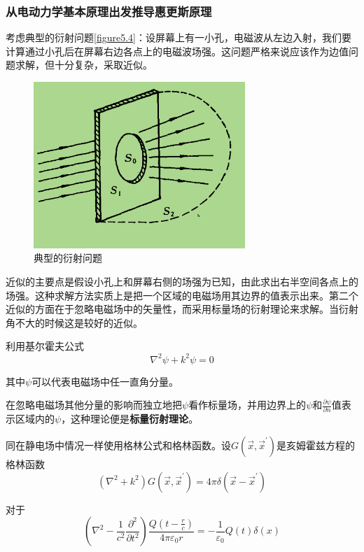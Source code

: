 \documentclass[UTF8]{ctexart}
\begin{document}
    \subsubsection{从电动力学基本原理出发推导惠更斯原理}
    考虑典型的衍射问题\autoref{figure5.4}：设屏幕上有一小孔，电磁波从左边入射，我们要计算通过小孔后在屏幕右边各点上的电磁波场强。这问题严格来说应该作为边值问题求解，但十分复杂，采取近似。
    \begin{figure}[htb]
        \centering
        \includegraphics[width=8cm]{figure5-4.png}
        \caption{典型的衍射问题}
        \label{figure5.4}
    \end{figure}

    近似的主要点是假设小孔上和屏幕右侧的场强为已知，由此求出右半空间各点上的场强。这种求解方法实质上是把一个区域的电磁场用其边界的值表示出来。第二个近似的方面在于忽略电磁场中的矢量性，而采用标量场的衍射理论来求解。当衍射角不大的时候这是较好的近似。

    利用基尔霍夫公式
    \begin{equation}
        \nabla^2 \psi + k^2 \psi = 0
    \end{equation}

\noindent 其中$\psi$可以代表电磁场中任一直角分量。

    在忽略电磁场其他分量的影响而独立地把$\psi$看作标量场，并用边界上的$\psi$和$\frac{\partial \psi }{\partial n}$值表示区域内的$\psi$，这种理论便是\textbf{标量衍射理论}。

    同在静电场中情况一样使用格林公式和格林函数。设$G(\vec{x},\vec{x}^{\prime})$是亥姆霍兹方程的格林函数
    \begin{equation}
        (\nabla^2 + k^2)G(\vec{x},\vec{x}^{\prime}) = 4 \pi \delta (\vec{x}- \vec{x}^{\prime})
    \end{equation}

\noindent 对于
\begin{equation}
    \left(\nabla^{2}-\frac{1}{c^{2}} \frac{\partial^{2}}{\partial t^{2}}\right) \frac{Q\left(t-\frac{r}{c}\right)}{4 \pi \varepsilon_{0} r}=-\frac{1}{\varepsilon_{0}} Q(t) \delta(x)
\end{equation}
\end{document}
